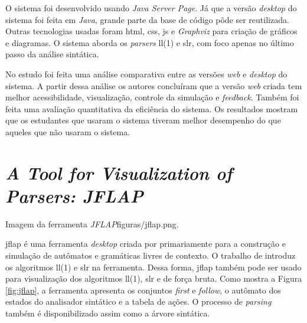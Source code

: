 O sistema foi desenvolvido usando \textit{Java Server Page}. Já que a versão \textit{desktop} do sistema foi feita em \textit{Java}, grande parte da base de código pôde ser reutilizada. Outras tecnologias usadas foram \gls{html}, \gls{css}, \gls{js} e \textit{Graphviz} para criação de gráficos e diagramas. O sistema aborda os \textit{parsers} \gls{ll}(1) e \gls{slr}, com foco apenas no último passo da análise sintática.

No estudo foi feita uma análise comparativa entre as versões \textit{web} e \textit{desktop} do sistema. A partir dessa análise os autores concluíram que a versão \textit{web} criada tem melhor acessibilidade, visualização, controle da simulação e \textit{feedback}. Também foi feita uma avaliação quantitativa da eficiência do sistema. Os resultados mostram que os estudantes que usaram o sistema tiveram melhor desempenho do que aqueles que não usaram o sistema.


\section{\textit{A Tool for Visualization of Parsers: JFLAP}}

\begin{mypicture}{\label{fig:jflap}}{Imagem da ferramenta \textit{JFLAP}}{figuras/jflap.png}{\textcite{jflap}.}
\end{mypicture}

\gls{jflap} é uma ferramenta \textit{desktop} criada por \textcite{jflap} primariamente para a construção e simulação de autômatos e gramáticas livres de contexto. O trabalho de \textcite{jflapparser} introduz os algoritmos \gls{ll}(1) e \gls{slr} na ferramenta. Dessa forma, \gls{jflap} também pode ser usado para visualização dos algoritmos \gls{ll}(1), \gls{slr} e de força bruta. Como mostra a Figura \ref{fig:jflap}, a ferramenta apresenta os conjuntos \textit{first} e \textit{follow}, o autômato dos estados do analisador sintático e a tabela de ações. O processo de \textit{parsing} também é disponibilizado assim como a árvore sintática.




